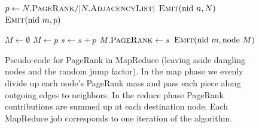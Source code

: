 \begin{figure}[t]
\algrenewcommand{}
\algrenewcommand{}
  \begin{algorithmic}[1]
    \State $p \gets N.\textsc{PageRank} / |N.\textsc{AdjacencyList}|$
    \State $\textsc{Emit}(\textrm{nid }n, N)$
      \State $\textsc{Emit}(\textrm{nid }m, p)$
    \EndFor
    \EndProcedure
    \EndFunction
  \end{algorithmic}

  \begin{algorithmic}[1]
    \State $M \gets \emptyset$
        \State $M \gets p$
      \Else
        \State $s \gets s + p$
      \EndIf
    \EndFor
    \State $M.\textsc{PageRank} \gets s$
    \State $\textsc{Emit}(\textrm{nid }m, \textrm{node }M)$
    \EndProcedure
    \EndFunction
  \end{algorithmic}
  \caption{Pseudo-code for PageRank in MapReduce (leaving aside
    dangling nodes and the random jump factor).  In the map phase we
    evenly divide up each node's PageRank mass and pass each piece
    along outgoing edges to neighbors.  In the reduce phase PageRank
    contributions are summed up at each destination node.  Each
    MapReduce job corresponds to one iteration of the algorithm.}
\label{figure:chapter-graphs:PageRank}
\end{figure}

